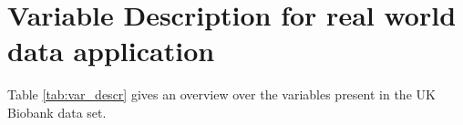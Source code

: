
\section{Variable Description for real world data application}

Table \ref{tab:var_descr} gives an overview over the variables present in the UK Biobank data set. 

